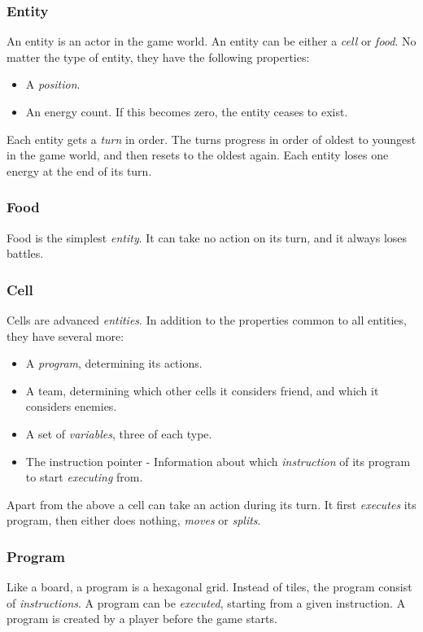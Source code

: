 \subsubsection{Entity}
An entity is an actor in the game world. An entity can be either a \emph{cell} or \emph{food}. No matter the type of entity, they have the following properties:
\begin{itemize}
\item A \emph{position}.
\item An energy count. If this becomes zero, the entity ceases to exist.
\end{itemize}
Each entity gets a \emph{turn} in order. The turns progress in order of oldest to youngest in the game world, and then resets to the oldest again. Each entity loses one energy at the end of its turn.

\subsubsection{Food}
Food is the simplest \emph{entity}. It can take no action on its turn, and it always loses battles.

\subsubsection{Cell}
Cells are advanced \emph{entities}. In addition to the properties common to all entities, they have several more:
\begin{itemize}
\item A \emph{program}, determining its actions.
\item A team, determining which other cells it considers friend, and which it considers enemies.
\item A set of \emph{variables}, three of each type.
\item The instruction pointer - Information about which \emph{instruction} of its program to start \emph{executing} from.
\end{itemize}
Apart from the above a cell can take an action during its turn. It first \emph{executes} its program, then either does nothing, \emph{moves} or \emph{splits}.

\subsubsection{Program}
Like a board, a program is a hexagonal grid. Instead of tiles, the program consist of \emph{instructions}. A program can be \emph{executed}, starting from a given instruction. A program is created by a player before the game starts.

